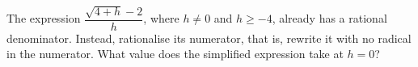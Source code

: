 The expression $\dfrac{\sqrt{4+h}-2}{h}$, where $h\ne0$ and $h\ge-4$, already has a rational denominator. Instead, rationalise its numerator, that is, rewrite it with no radical in the numerator. What value does the simplified expression take at $h=0$?
